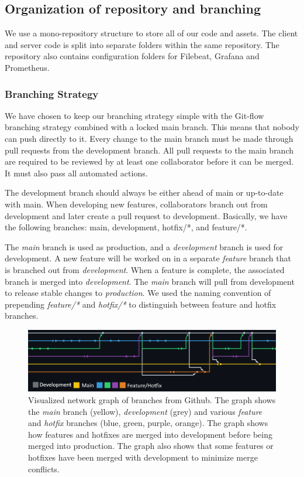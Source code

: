 \documentclass{article}
\begin{document}
\subsection{Organization of repository and branching}
We use a mono-repository structure to store all of our code and assets. The client and server code is split into separate folders within the same repository. The repository also contains configuration folders for Filebeat, Grafana and Prometheus.

\subsubsection{Branching Strategy}
We have chosen to keep our branching strategy simple with the Git-flow branching strategy combined with a locked main branch. This means that nobody can push directly to it. Every change to the main branch must be made through pull requests from the development branch. All pull requests to the main branch are required to be reviewed by at least one collaborator before it can be merged. It must also pass all automated actions.

The development branch should always be either ahead of main or up-to-date with main. When developing new features, collaborators branch out from development and later create a pull request to development. Basically, we have the following branches: main, development, hotfix/*, and feature/*.

The \textit{main} branch is used as production, and a \textit{development} branch is used for development. A new feature will be worked on in a separate \textit{feature} branch that is branched out from \textit{development}. When a feature is complete, the associated branch is merged into \textit{development}. The \textit{main} branch will pull from development to release stable changes to \textit{production}. We used the naming convention of prepending \textit{feature/*} and \textit{hotfix/*} to distinguish between feature and hotfix branches.

\begin{figure}[H]
   \centering
   \includegraphics[width=\textwidth]{branching.png}
   \caption{Visualized network graph of branches from Github. The graph shows the \textit{main} branch (yellow), \textit{development} (grey) and various \textit{feature} and \textit{hotfix} branches (blue, green, purple, orange). The graph shows how features and hotfixes are merged into development before being merged into production. The graph also shows that some features or hotfixes have been merged with development to minimize merge conflicts.}
   \label{fig:my_label}
\end{figure}
\end{document}
